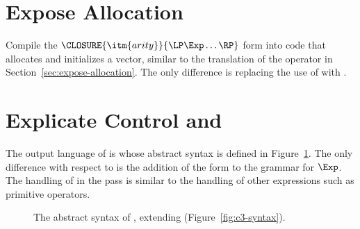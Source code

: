 \documentclass[7x10]{TimesAPriori_MIT}%
\newcommand{\gray}[1]{{\color{gray} #1}}
\def\racketEd{0}
\def\edition{1}
\begin{document}
\section{Expose Allocation}
\label{sec:expose-allocation-r5}

Compile the $\CLOSURE{\itm{arity}}{\LP\Exp\ldots\RP}$ form into code
that allocates and initializes a vector, similar to the translation of
the  operator in Section~\ref{sec:expose-allocation}.
The only difference is replacing the use of
 with
.


\section{Explicate Control and \LangCLam{}}
\label{sec:explicate-r5}

The output language of  is \LangCLam{} whose
abstract syntax is defined in Figure~\ref{fig:c4-syntax}.  The only
difference with respect to \LangCFun{} is the addition of the
 form to the grammar for $\Exp$.  The handling
of  in the  pass is
similar to the handling of other expressions such as primitive
operators.

\begin{figure}[tp]
\fbox{
\begin{minipage}{0.96\textwidth}
\small
{\if\edition\racketEd
\[
\begin{array}{lcl}
\Exp &::= & \ldots
   \MID \ALLOCCLOS{\Int}{\Type}{\Int} \\
\Stmt &::=& \gray{ \ASSIGN{\VAR{\Var}}{\Exp} 
       \MID \LP\key{Collect} \,\itm{int}\RP } \\
\Tail &::= & \gray{ \RETURN{\Exp} \MID \SEQ{\Stmt}{\Tail} 
       \MID \GOTO{\itm{label}} } \\
    &\MID& \gray{ \IFSTMT{\BINOP{\itm{cmp}}{\Atm}{\Atm}}{\GOTO{\itm{label}}}{\GOTO{\itm{label}}}  }\\
    &\MID& \gray{ \TAILCALL{\Atm}{\Atm\ldots} } \\
\Def &::=& \gray{ \DEF{\itm{label}}{\LP[\Var\key{:}\Type]\ldots\RP}{\Type}{\itm{info}}{\LP\LP\itm{label}\,\key{.}\,\Tail\RP\ldots\RP} }\\
\LangCLamM{} & ::= & \gray{ \PROGRAMDEFS{\itm{info}}{\LP\Def\ldots\RP} }
\end{array}
\]
\fi}
\end{minipage}
}
\caption{The abstract syntax of \LangCLam{}, extending \LangCFun{} (Figure~\ref{fig:c3-syntax}).}
\label{fig:c4-syntax}
\end{figure}
\end{document}
